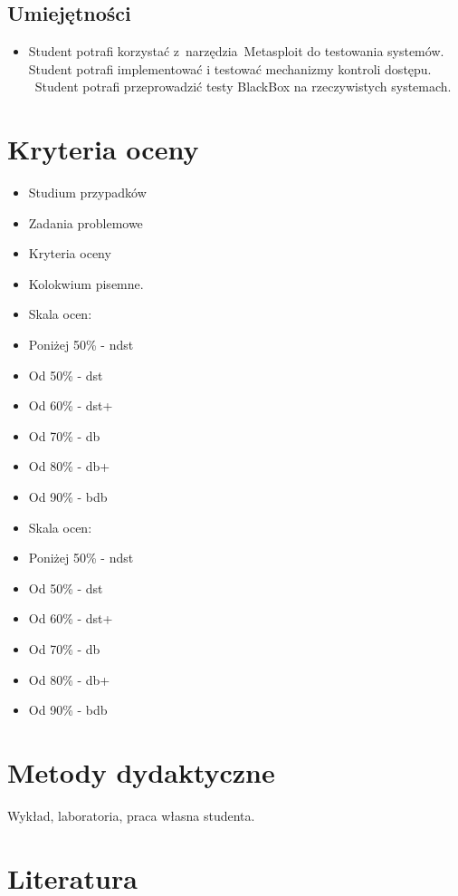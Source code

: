 \documentclass[12pt, a4paper]{article}
\begin{document}
\subsection*{Umiejętności}
\begin{itemize}
  \item Student potrafi korzystać z narzędzia Metasploit do testowania systemów. Student potrafi implementować i testować mechanizmy kontroli dostępu.  Student potrafi przeprowadzić testy BlackBox na rzeczywistych systemach.
\end{itemize}

\section{Kryteria oceny}

\begin{itemize}
  \item Studium przypadków
  \item Zadania problemowe
  \item Kryteria oceny
  \item Kolokwium pisemne.
  \item Skala ocen:
  \item Poniżej 50\% - ndst
  \item Od 50\% - dst
  \item Od 60\% - dst+
  \item Od 70\% - db
  \item Od 80\% - db+
  \item Od 90\% - bdb
  \item Skala ocen:
  \item Poniżej 50\% - ndst
  \item Od 50\% - dst
  \item Od 60\% - dst+
  \item Od 70\% - db
  \item Od 80\% - db+
  \item Od 90\% - bdb
\end{itemize}

\section{Metody dydaktyczne}

Wykład, laboratoria, praca własna studenta.

\section{Literatura}
\end{document}

